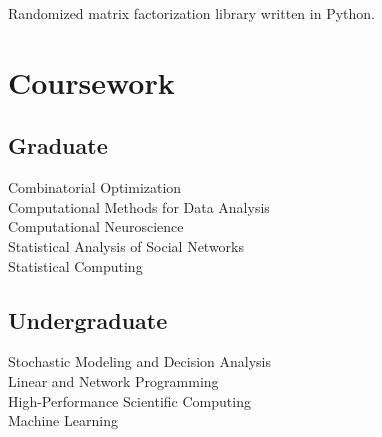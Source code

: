 \documentclass[]{deedy-resume-openfont}
\begin{document}
\begin{minipage}[t]{0.35\textwidth}
 
Randomized matrix factorization library written in Python.
\sectionsep


\section{Coursework}
\subsection{Graduate}
Combinatorial Optimization \\
Computational Methods for Data Analysis \\
Computational Neuroscience \\
Statistical Analysis of Social Networks \\
Statistical Computing
\sectionsep

\subsection{Undergraduate}
Stochastic Modeling and Decision Analysis \\
Linear and Network Programming \\
High-Performance Scientific Computing \\
Machine Learning


\end{minipage}
\hfill
\end{document}
